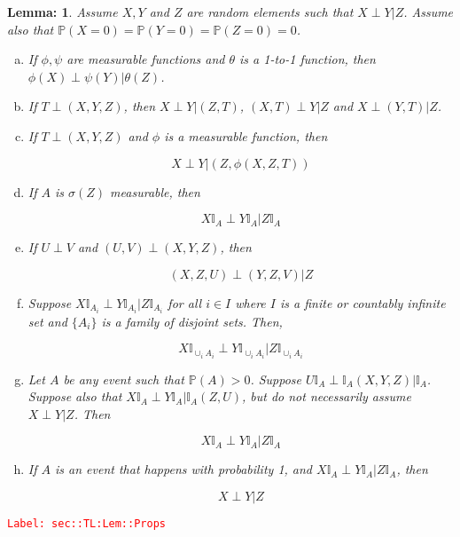 \documentclass[12pt]{article}
\newcommand{\mb}{\mathbb}
\newcommand{\tr}{\textcolor{red}}
\newcommand{\labe}[1]{\tr{\texttt{Label: #1}}}
\newcommand{\pr}{\mb{P}}							%
\newtheorem{lem}[thms]{Lemma: }
\begin{document}
\begin{lem}
Assume \(X,Y\) and \(Z\) are random elements such that \(X\perp Y|Z\). Assume also that \(\pr(X=0) = \pr(Y=0) = \pr(Z=0) = 0\).

\begin{enumerate}[(a)]
\item If \(\phi,\psi\) are measurable functions and \(\theta\) is a 1-to-1 function, then \(\phi(X)\perp \psi(Y)|\theta(Z)\).

\item If \(T\perp(X,Y,Z)\), then \(X\perp Y|(Z,T)\), \((X,T)\perp Y|Z\) and \(X\perp (Y,T)|Z\).

\item If \(T\perp (X,Y,Z)\) and \(\phi\) is a measurable function, then

\[X\perp Y|(Z,\phi(X,Z,T))\]

\item If \(A\) is \(\sigma(Z)\) measurable, then 

\[X\mb{I}_A\perp Y\mb{I}_A|Z\mb{I}_A\]

\item If \(U\perp V\) and \((U,V)\perp(X,Y,Z)\), then 

\[(X,Z,U)\perp (Y,Z,V)|Z\]

\item Suppose \(X\mb{I}_{A_i}\perp Y\mb{I}_{A_i}|Z\mb{I}_{A_i}\) for all \(i\in I\) where \(I\) is a finite or countably infinite set and \(\{A_i\}\) is a family of disjoint sets. Then,

\[X\mb{I}_{\cup_i A_i}\perp Y\mb{I}_{\cup_i A_i}|Z\mb{I}_{\cup_i A_i}\]

\item Let \(A\) be any event such that \(\pr(A) > 0\). Suppose \(U\mb{I}_A\perp \mb{I}_A(X,Y,Z)|\mb{I}_A\). Suppose also that \(X\mb{I}_A\perp Y\mb{I}_A|\mb{I}_A(Z,U)\), but do not necessarily assume \(X\perp Y|Z\). Then 

\[X\mb{I}_A\perp Y\mb{I}_A|Z\mb{I}_A\]

\item If \(A\) is an event that happens with probability 1, and \(X\mb{I}_A \perp Y\mb{I}_A |Z\mb{I}_A\), then 

\[X\perp Y |Z\]
\end{enumerate}
\label{sec::TL:Lem::Props}
\end{lem}
\labe{sec::TL:Lem::Props}
\end{document}
